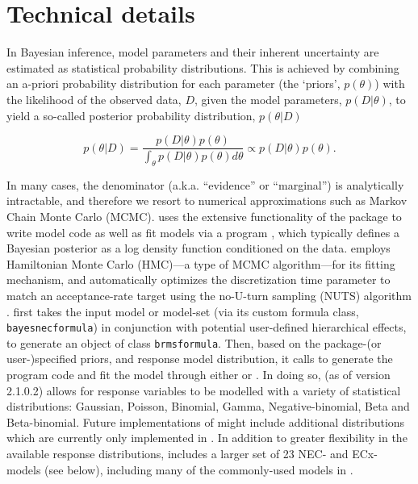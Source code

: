 \documentclass[
  shortnames]{jss}
\begin{document}
\hypertarget{technical-details}{%
\section{Technical details}\label{technical-details}}

In Bayesian inference, model parameters and their inherent uncertainty are estimated as statistical probability distributions. This is achieved by combining an a-priori probability distribution for each parameter (the `priors', \(p(\theta)\)) with the likelihood of the observed data, \(D\), given the model parameters, \(p(D | \theta)\), to yield a so-called posterior probability distribution, \(p(\theta | D)\)

\begin{equation}
  p(\theta | D) = \frac{p(D | \theta) p(\theta)}{\int_{\theta} p(D | \theta) p(\theta) d \theta} \propto p(D | \theta) p(\theta).
  \label{eqn1}
\end{equation}

In many cases, the denominator (a.k.a. ``evidence'' or ``marginal'') is analytically intractable, and therefore we resort to numerical approximations such as Markov Chain Monte Carlo (MCMC).  uses the extensive functionality of the  package to write model code as well as fit models via a  program \citep{stan2021}, which typically defines a Bayesian posterior as a log density function conditioned on the data.  employs Hamiltonian Monte Carlo (HMC)---a type of MCMC algorithm---for its fitting mechanism, and automatically optimizes the discretization time parameter to match an acceptance-rate target using the no-U-turn sampling (NUTS) algorithm \citep{hoffman2014}.  first takes the input model or model-set (via its custom formula class, \texttt{bayesnecformula}) in conjunction with potential user-defined hierarchical effects, to generate an object of class \texttt{brmsformula}. Then, based on the package-(or user-)specified priors, and response model distribution, it calls  \citep{Burkner2017, Burkner2018} to generate the  program code and fit the model through either  \citep{rstan2021} or \citep{cmdstanr2022}. In doing so,  (as of version 2.1.0.2) allows for response variables to be modelled with a variety of statistical distributions: Gaussian, Poisson, Binomial, Gamma, Negative-binomial, Beta and Beta-binomial. Future implementations of  might include additional distributions which are currently only implemented in . In addition to greater flexibility in the available response distributions,  includes a larger set of 23 NEC- and ECx- models (see below), including many of the commonly-used models in  \citep{Ritz2016}.
\end{document}
